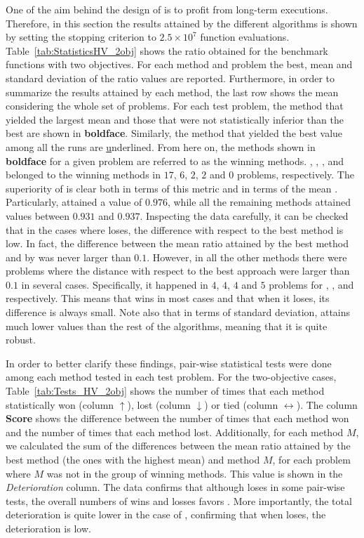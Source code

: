 One of the aim behind the design of \AVSDMOEAD{} is to profit from long-term executions.
%
Therefore, in this section the results attained by the different algorithms is shown by setting 
the stopping criterion to $2.5 \times 10^7$ function evaluations.
%
Table~\ref{tab:StatisticsHV_2obj} shows the \HV{} ratio obtained for the benchmark functions with two objectives.
%
For each method and problem the best, mean and standard deviation of the \HV{} ratio values are reported.
%
Furthermore, in order to summarize the results attained by each method, the last row shows the mean considering the whole set 
of problems.
%
For each test problem, the method that yielded the largest mean and those that were not statistically inferior than the 
best are shown in \textbf{boldface}.
%
Similarly, the method that yielded the best \HV{} value among all the runs are {\ul underlined}.
%
From here on, the methods shown in {\bf boldface} for a given problem are referred to as the winning methods.
%
\AVSDMOEAD{}, \RMOEA{}, \MOEADDE{}, \NSGAIII{} and \NSGAII{} belonged to the winning methods in 
$17$, $6$, $2$, $2$ and $0$ problems, respectively.
%
The superiority of \AVSDMOEAD{} is clear both in terms of this metric and in terms of the mean \HV{}.
%
Particularly, \AVSDMOEAD{} attained a value of $0.976$, while all the remaining methods attained values between
$0.931$ and $0.937$.
%
Inspecting the data carefully, it can be checked that in the cases where \AVSDMOEAD{} loses, the difference with respect to the best 
method is low.
%
In fact, the difference between the mean \HV{} ratio attained by the best method and by \AVSDMOEAD{} was never larger than $0.1$.
%
However, in all the other methods there were problems where the distance with respect to the best approach
were larger than $0.1$ in several cases.
%
Specifically, it happened in $4$, $4$, $4$ and $5$ problems for \RMOEA{}, \MOEADDE{}, \NSGAII{} and \NSGAIII{} respectively.
%
This means that \AVSDMOEAD{} wins in most cases and that when it loses, its difference is always small.
%
Note also that in terms of standard deviation, \AVSDMOEAD{} attains much lower values than the rest of the algorithms, meaning that
it is quite robust.


In order to better clarify these findings, pair-wise statistical tests were done among each method tested in each test problem.
%
For the two-objective cases, Table~\ref{tab:Tests_HV_2obj} shows the number of times that each method statistically won 
(column $\uparrow$), lost (column $\downarrow$) or tied (column $\leftrightarrow$).
%
The column \textbf{Score} shows the difference between the number of times that each method won and the number of times that each 
method lost.
%
Additionally, for each method $M$, we calculated the sum of the differences between the mean \HV{} ratio attained by the best method 
(the ones with the highest mean) and method $M$, for each problem where $M$ was not in the group of winning methods.
%
This value is shown in the \textit{Deterioration} column.
%
The data confirms that although \AVSDMOEAD{} loses in some pair-wise tests, the overall numbers of wins and losses favors \AVSDMOEAD{}.
%
More importantly, the total deterioration is quite lower in the case of \AVSDMOEAD{}, confirming that when \AVSDMOEAD{} loses, 
the deterioration is low.

